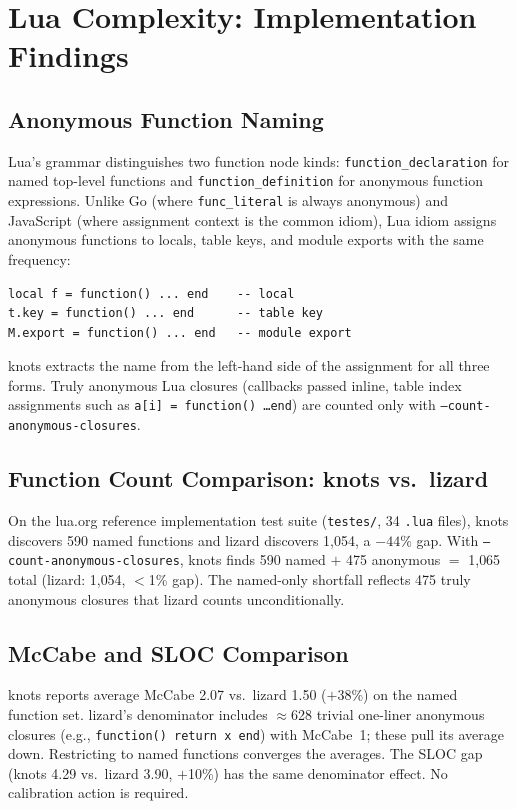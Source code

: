 \documentclass[10pt,twocolumn,letterpaper]{article}
\begin{document}
\section{Lua Complexity: Implementation Findings}
\label{sec:lua-findings}

\subsection{Anonymous Function Naming}

Lua's grammar distinguishes two function node kinds: \texttt{function\_declaration}
for named top-level functions and \texttt{function\_definition} for anonymous
function expressions.  Unlike Go (where \texttt{func\_literal} is always
anonymous) and JavaScript (where assignment context is the common idiom),
Lua idiom assigns anonymous functions to locals, table keys, and module
exports with the same frequency:

\begin{verbatim}
local f = function() ... end    -- local
t.key = function() ... end      -- table key
M.export = function() ... end   -- module export
\end{verbatim}

knots extracts the name from the left-hand side of the assignment for all
three forms.  Truly anonymous Lua closures (callbacks passed inline,
table index assignments such as \texttt{a[i] = function() \ldots end})
are counted only with \texttt{--count-anonymous-closures}.

\subsection{Function Count Comparison: knots vs.\ lizard}

On the lua.org reference implementation test suite (\texttt{testes/},
34 \texttt{.lua} files), knots discovers 590 named functions and lizard
discovers 1{,}054, a $-44\%$ gap.  With \texttt{--count-anonymous-closures},
knots finds 590 named $+$ 475 anonymous $=$ 1{,}065 total (lizard: 1{,}054,
$<$1\% gap).  The named-only shortfall reflects 475 truly anonymous closures
that lizard counts unconditionally.

\subsection{McCabe and SLOC Comparison}

knots reports average McCabe 2.07 vs.\ lizard 1.50 ($+$38\%) on the named
function set.  lizard's denominator includes $\approx$628 trivial one-liner
anonymous closures (e.g., \texttt{function() return x end}) with McCabe~1;
these pull its average down.  Restricting to named functions converges the
averages.  The SLOC gap (knots 4.29 vs.\ lizard 3.90, $+$10\%) has the same
denominator effect.  No calibration action is required.
\end{document}
